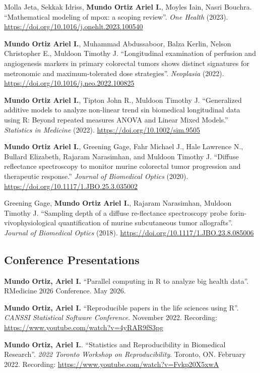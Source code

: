 \documentclass[10pt,]{article}
\begin{document}
Molla Jeta, Sekkak Idriss, \textbf{Mundo Ortiz Ariel I.}, Moyles Iain,
Nasri Bouchra. ``Mathematical modeling of mpox: a scoping review''.
\emph{One Health} (2023).
\url{https://doi.org/10.1016/j.onehlt.2023.100540}

\textbf{Mundo Ortiz Ariel I.}, Muhammad Abdussaboor, Balza Kerlin,
Nelson Christopher E., Muldoon Timothy J. ``Longitudinal examination of
perfusion and angiogenesis markers in primary colorectal tumors shows
distinct signatures for metronomic and maximum-tolerated dose
strategies''. \emph{Neoplasia} (2022).
\url{https://doi.org/10.1016/j.neo.2022.100825}

\textbf{Mundo Ortiz Ariel I.}, Tipton John R., Muldoon Timothy J.
``Generalized additive models to analyze non-linear trend sin biomedical
longitudinal data using R: Beyond repeated measures ANOVA and Linear
Mixed Models.'' \emph{Statistics in Medicine} (2022).
\url{https://doi.org/10.1002/sim.9505}

\textbf{Mundo Ortiz Ariel I.}, Greening Gage, Fahr Michael J., Hale
Lawrence N., Bullard Elizabeth, Rajaram Narasimhan, and Muldoon Timothy
J. ``Diffuse reflectance spectroscopy to monitor murine colorectal tumor
progression and therapeutic response.'' \emph{Journal of Biomedical
Optics} (2020). \url{https://doi.org/10.1117/1.JBO.25.3.035002}

Greening Gage, \textbf{Mundo Ortiz Ariel I.}, Rajaram Narasimhan,
Muldoon Timothy J. ``Sampling depth of a diffuse re-flectance
spectroscopy probe forin-vivophysiological quantification of murine
subcutaneous tumor allografts''. \emph{Journal of Biomedical Optics}
(2018). \url{https://doi.org/10.1117/1.JBO.23.8.085006}

\subsection{Conference Presentations}\label{conference-presentations}

\textbf{Mundo Ortiz, Ariel I.} ``Parallel computing in R to analyze big
health data''. RMedicine 2026 Conference. May 2026.

\textbf{Mundo Ortiz, Ariel I.} ``Reproducible papers in the life
sciences using R''. \emph{CANSSI Statistical Software Conference}.
November 2022. Recording:
\url{https://www.youtube.com/watch?v=4yRAR9fS3pg}

\textbf{Mundo Ortiz, Ariel I.}. ``Statistics and Reproducibility in
Biomedical Research''. \emph{2022 Toronto Workshop on Reproducibility}.
Toronto, ON. February 2022. Recording:
\url{https://www.youtube.com/watch?v=Fvkp20X5xwA}
\end{document}
